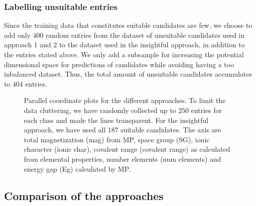 \subsubsection{Labelling unsuitable entries}

Since the training data that constitutes suitable candidates are few, we choose to add only $400$ random entries from the dataset of unsuitable candidates used in approach $1$ and $2$ to the dataset used in the insightful approach, in addition to the entries stated above. We only add a subsample for increasing the potential dimensional space for predictions of candidates while avoiding having a too inbalanced dataset. Thus, the total amount of unsuitable candidates accumulates to $404$ entries.

\begin{figure}[ht!]
    \centering
    \begin{subfigure}{1\textwidth}
        \centering
          
    \end{subfigure}
    \begin{subfigure}{1\textwidth}
        \centering
          
    \end{subfigure}
    \begin{subfigure}{1\textwidth}
        \centering
          
    \end{subfigure}
    \vspace*{-95mm}
    \caption{Parallel coordinate plots for the different approaches. To limit the data cluttering, we have randomly collected up to $250$ entries for each class and made the lines transparent. For the insightful approach, we have used all $187$ suitable candidates. The axis are total magnetization (mag) from MP, space group (SG), ionic character (ionic char), covalent range (covalent range) as calculated from elemental properties, number elements (num elements) and energy gap (Eg) calculated by MP.}
    \label{fig:parallel-coordinates-approaches}
\end{figure}

\clearpage


\subsection{Comparison of the approaches}

